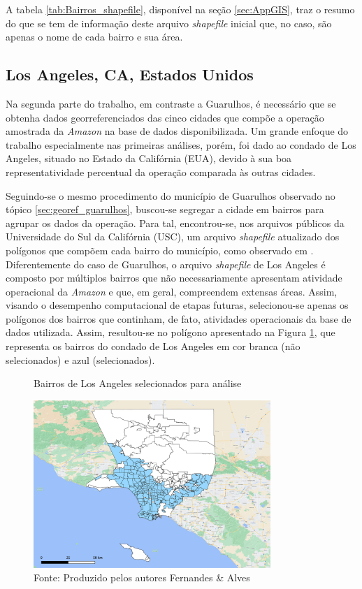 A tabela \ref{tab:Bairros_shapefile}, disponível na seção \ref{sec:AppGIS}, traz o resumo do que se tem de informação deste arquivo \textit{shapefile} inicial que, no caso, são apenas o nome de cada bairro e sua área.

\subsection{Los Angeles, CA, Estados Unidos} \label{SIG_LA}

Na segunda parte do trabalho, em contraste a Guarulhos, é necessário que se obtenha dados georreferenciados das cinco cidades que compõe a operação amostrada da \textit{Amazon} na base de dados disponibilizada. 
%
Um grande enfoque do trabalho especialmente nas primeiras análises, porém, foi dado ao condado de Los Angeles, situado no Estado da Califórnia (EUA), devido à sua boa representatividade percentual da operação comparada às outras cidades.

Seguindo-se o mesmo procedimento do município de Guarulhos observado no tópico \ref{sec:georef_guarulhos}, buscou-se segregar a cidade em bairros para agrupar os dados da operação. 
%
Para tal, encontrou-se, nos arquivos públicos da Universidade do Sul da Califórnia (USC), um arquivo \textit{shapefile} atualizado dos polígonos que compõem cada bairro do município, como observado em .
%
Diferentemente do caso de Guarulhos, o arquivo \textit{shapefile} de Los Angeles é composto por múltiplos bairros que não necessariamente apresentam atividade operacional da \textit{Amazon} e que, em geral, compreendem extensas áreas. 
%
Assim, visando o desempenho computacional de etapas futuras, selecionou-se apenas os polígonos dos bairros que continham, de fato, atividades operacionais da base de dados utilizada. 
%
Assim, resultou-se no polígono apresentado na Figura \ref{fig:bairros_LA}, que representa os bairros do condado de Los Angeles em cor branca (não selecionados) e azul (selecionados).

\begin{figure}[htbp]
    \centering
    \caption{Bairros de Los Angeles selecionados para análise}
    \includegraphics[width=0.8\textwidth]{images/4_materiais/gis/LA_BairrosSelecionados.png}
    \caption*{Fonte: Produzido pelos autores Fernandes \& Alves}
    \label{fig:bairros_LA}
\end{figure}

